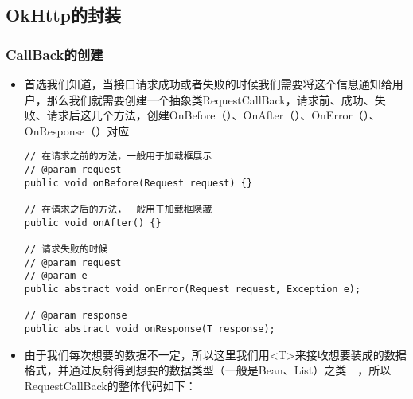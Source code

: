 \documentclass[9pt, b5paper]{article}
\begin{document}
\subsection{OkHttp的封装}
\label{sec-3-3}
\subsubsection{CallBack的创建　　}
\label{sec-3-3-1}
\begin{itemize}
\item 首选我们知道，当接口请求成功或者失败的时候我们需要将这个信息通知给用户，那么我们就需要创建一个抽象类RequestCallBack，请求前、成功、失败、请求后这几个方法，创建OnBefore（）、OnAfter（）、OnError（）、OnResponse（）对应
\begin{verbatim}
// 在请求之前的方法，一般用于加载框展示
// @param request
public void onBefore(Request request) {}
 
// 在请求之后的方法，一般用于加载框隐藏
public void onAfter() {}
 
// 请求失败的时候
// @param request
// @param e
public abstract void onError(Request request, Exception e);
 
// @param response
public abstract void onResponse(T response);
\end{verbatim}
\item 由于我们每次想要的数据不一定，所以这里我们用<T>来接收想要装成的数据格式，并通过反射得到想要的数据类型（一般是Bean、List）之类　，所以RequestCallBack的整体代码如下：
\end{itemize}
\end{document}
